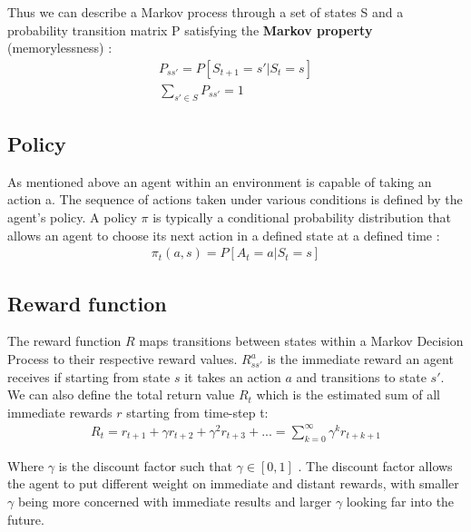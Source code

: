 Thus we can describe a Markov process through a set of states S and a probability transition matrix P satisfying the \textbf{Markov property} (memorylessness) \cite{markov_chain_article}:
\begin{align}
    P_{ss'} = P[S_{t+1} = s' | S_{t} = s]\\
    \sum_{s' \in S} P_{ss'} = 1
\end{align}

\subsection{Policy}
As mentioned above an agent within an environment is capable of taking an action a. The sequence of actions taken under 
various conditions is defined by the agent's policy.
A policy $\pi$ is typically a conditional probability distribution that allows an agent to choose its next action in a defined state at a defined time \cite{lecture_lets_go_markov}:
\begin{align}
    \pi_t(a, s) = P[A_t = a | S_t = s]
\end{align}

\subsection{Reward function}
The reward function $R$ maps transitions between states within a
Markov Decision Process to their respective reward values.
$R_{ss'}^{a}$ is the immediate reward an agent receives if starting from state $s$ it takes an action $a$ and transitions to state $s'$.\\

We can also define the total return value $R_t$ which is the estimated sum of all immediate rewards $r$ starting from time-step t:
\begin{align}
    R_t = r_{t+1} + \gamma r_{t+2} + \gamma ^2 r_{t+3} + ... = \sum^{\infty}_{k=0}\gamma^{k}r_{t+k+1} \label{eq:return}
\end{align}

Where $\gamma$ is the discount factor such that $\gamma \in [0, 1]$ \cite{lecture_lets_go_markov}. The discount factor allows the agent to put different weight on immediate and distant rewards, with smaller $\gamma$ being more concerned with immediate results and larger $\gamma$ looking far into the future. 


